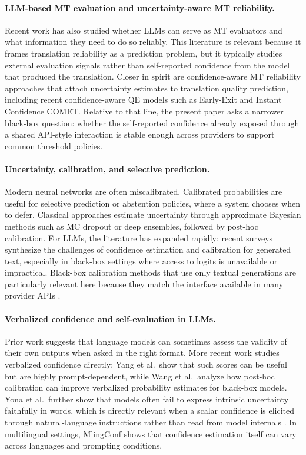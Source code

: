 \documentclass[10pt,conference]{IEEEtran}
\begin{document}
\paragraph{LLM-based MT evaluation and uncertainty-aware MT reliability.}
Recent work has also studied whether LLMs can serve as MT evaluators and what information they need to do so reliably. This literature is relevant because it frames translation reliability as a prediction problem, but it typically studies external evaluation signals rather than self-reported confidence from the model that produced the translation. Closer in spirit are confidence-aware MT reliability approaches that attach uncertainty estimates to translation quality prediction, including recent confidence-aware QE models such as Early-Exit and Instant Confidence COMET. Relative to that line, the present paper asks a narrower black-box question: whether the self-reported confidence already exposed through a shared API-style interaction is stable enough across providers to support common threshold policies.

\paragraph{Uncertainty, calibration, and selective prediction.}
Modern neural networks are often miscalibrated. Calibrated probabilities are useful for selective prediction or abstention policies, where a system chooses when to defer. Classical approaches estimate uncertainty through approximate Bayesian methods such as MC dropout  or deep ensembles, followed by post-hoc calibration. For LLMs, the literature has expanded rapidly: recent surveys synthesize the challenges of confidence estimation and calibration for generated text, especially in black-box settings where access to logits is unavailable or impractical. Black-box calibration methods that use only textual generations are particularly relevant here because they match the interface available in many provider APIs \citep{ulmer-etal-2024-calibrating}.

\paragraph{Verbalized confidence and self-evaluation in LLMs.}
Prior work suggests that language models can sometimes assess the validity of their own outputs when asked in the right format. More recent work studies verbalized confidence directly: Yang et al.\ show that such scores can be useful but are highly prompt-dependent, while Wang et al.\ analyze how post-hoc calibration can improve verbalized probability estimates for black-box models. Yona et al.\ further show that models often fail to express intrinsic uncertainty faithfully in words, which is directly relevant when a scalar confidence is elicited through natural-language instructions rather than read from model internals \citep{yona-etal-2024-large}. In multilingual settings, MlingConf shows that confidence estimation itself can vary across languages and prompting conditions.
\end{document}
